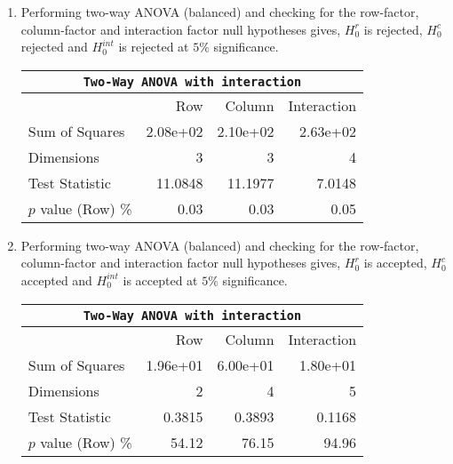 \begin{enumerate}
\begin{table}[H]
		\bigskip
	\end{table}

	\item Performing two-way ANOVA (balanced) and checking for the row-factor, column-factor and interaction factor null hypotheses gives,
	$ H_0^r $ is rejected, $ H_0^c $ rejected and $ H_0^{int} $ is rejected at $ 5\% $ significance.
	
	\begin{table}[H]
		\centering
		\begin{tabular}{@{}lrrr@{}}
			\toprule
			\multicolumn{4}{c}{\texttt{Two-Way ANOVA with interaction}}\\ 
			\midrule
			{} &       Row &    Column & Interaction \\
			\midrule
			Sum of Squares     &  2.08e+02 &  2.10e+02 &    2.63e+02 \\
			Dimensions         &         3 &         3 &           4 \\
			Test Statistic     &   11.0848 &   11.1977 &      7.0148 \\
			$p$ value (Row) \% &      0.03 &      0.03 &        0.05 \\
			\bottomrule
		\end{tabular}
		
		\bigskip
	\end{table}
	
	\item Performing two-way ANOVA (balanced) and checking for the row-factor, column-factor and interaction factor null hypotheses gives,
	$ H_0^r $ is accepted, $ H_0^c $ accepted and $ H_0^{int} $ is accepted at $ 5\% $ significance.
	
	\begin{table}[H]
		\centering
		\begin{tabular}{@{}lrrr@{}}
			\toprule
			\multicolumn{4}{c}{\texttt{Two-Way ANOVA with interaction}}\\ 
			\midrule
			{} &       Row &    Column & Interaction \\
			\midrule
			Sum of Squares     &  1.96e+01 &  6.00e+01 &    1.80e+01 \\
			Dimensions         &         2 &         4 &           5 \\
			Test Statistic     &    0.3815 &    0.3893 &      0.1168 \\
			$p$ value (Row) \% &     54.12 &     76.15 &       94.96 \\
			\bottomrule
		\end{tabular}
		

\end{table}
\end{enumerate}
